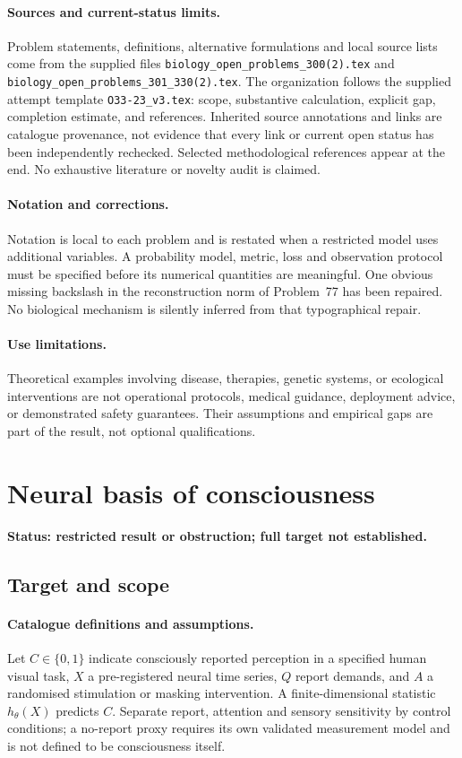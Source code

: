 \documentclass[11pt]{article}
\begin{document}
\paragraph{Sources and current-status limits.}
Problem statements, definitions, alternative formulations and local source lists
come from the supplied files
\texttt{biology\_open\_problems\_300(2).tex} and
\texttt{biology\_open\_problems\_301\_330(2).tex}.
The organization follows the supplied attempt template
\texttt{O33-23\_v3.tex}: scope, substantive calculation, explicit gap,
completion estimate, and references. Inherited source annotations and links are
catalogue provenance, not evidence that every link or current open status has
been independently rechecked. Selected methodological references appear at the
end. No exhaustive literature or novelty audit is claimed.

\paragraph{Notation and corrections.}
Notation is local to each problem and is restated when a restricted model uses
additional variables. A probability model, metric, loss and observation protocol
must be specified before its numerical quantities are meaningful. One obvious
missing backslash in the reconstruction norm of Problem~77 has been repaired.
No biological mechanism is silently inferred from that typographical repair.

\paragraph{Use limitations.}
Theoretical examples involving disease, therapies, genetic systems, or ecological
interventions are not operational protocols, medical guidance, deployment advice,
or demonstrated safety guarantees. Their assumptions and empirical gaps are part
of the result, not optional qualifications.


\section*{Neural basis of consciousness}
\label{prob:103}
\noindent\textbf{Status: restricted result or obstruction; full target not established.}
\subsection{Target and scope}
\paragraph{Catalogue definitions and assumptions.}
Let $C\in\{0,1\}$ indicate consciously reported perception in a specified human visual task, $X$ a pre-registered neural time series, $Q$ report demands, and $A$ a randomised stimulation or masking intervention. A finite-dimensional statistic $h_\theta(X)$ predicts $C$. Separate report, attention and sensory sensitivity by control conditions; a no-report proxy requires its own validated measurement model and is not defined to be consciousness itself.
\end{document}
